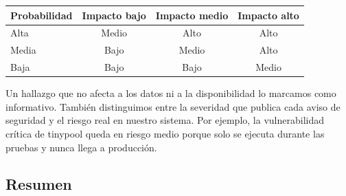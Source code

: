 \documentclass[12pt, letterpaper]{article}
\begin{document}
\begin{center}
\small
\renewcommand{\arraystretch}{1.4}
\begin{tabular}{lccc}
\toprule
\textbf{Probabilidad} & \textbf{Impacto bajo} & \textbf{Impacto medio} & \textbf{Impacto alto} \\
\midrule
Alta  & \cellcolor{orange!30}Medio & \cellcolor{red!25}Alto & \cellcolor{red!25}Alto \\
Media & \cellcolor{yellow!25}Bajo & \cellcolor{orange!30}Medio & \cellcolor{red!25}Alto \\
Baja  & \cellcolor{yellow!25}Bajo & \cellcolor{yellow!25}Bajo & \cellcolor{orange!30}Medio \\
\bottomrule
\end{tabular}
\end{center}

Un hallazgo que no afecta a los datos ni a la disponibilidad lo marcamos como informativo. También distinguimos entre la severidad que publica cada aviso de seguridad y el riesgo real en nuestro sistema. Por ejemplo, la vulnerabilidad crítica de tinypool queda en riesgo medio porque solo se ejecuta durante las pruebas y nunca llega a producción.

\subsection{Resumen}
\end{document}
